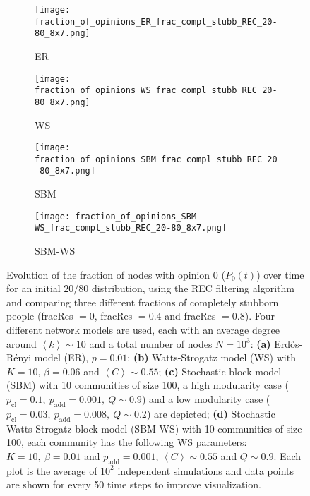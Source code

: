 \documentclass[11 pt , letterpaper , twoside , openright]{book}
\begin{document}
\begin{figure}[H]
  \begin{subfigure}[b]{0.49\textwidth}
  	\texttt{[image: fraction\_of\_opinions\_ER\_frac\_compl\_stubb\_REC\_20-80\_8x7.png]}
    \caption{ER}
  \end{subfigure}
  \begin{subfigure}[b]{0.49\textwidth}
  	\texttt{[image: fraction\_of\_opinions\_WS\_frac\_compl\_stubb\_REC\_20-80\_8x7.png]}
    \caption{WS}
  \end{subfigure}
  \begin{subfigure}[b]{0.49\textwidth}
    \texttt{[image: fraction\_of\_opinions\_SBM\_frac\_compl\_stubb\_REC\_20-80\_8x7.png]}
    \caption{SBM}
  \end{subfigure}
  \begin{subfigure}[b]{0.49\textwidth}
    \texttt{[image: fraction\_of\_opinions\_SBM-WS\_frac\_compl\_stubb\_REC\_20-80\_8x7.png]}
    \caption{SBM-WS}
  \end{subfigure}
  \captionsetup{format=plain}
  \caption[Evolution of the fraction of nodes with opinion 0 ($P_0(t)$) over time for an initial $20/80$ opinion distribution, using the REC filtering algorithm and comparing three different fractions of completely stubborn people (fracRes $= 0$, fracRes $= 0.4$ and fracRes $= 0.8$).]{Evolution of the fraction of nodes with opinion 0 ($P_0(t)$) over time for an initial $20/80$ distribution, using the REC filtering algorithm and comparing three different fractions of completely stubborn people (fracRes $= 0$, fracRes $= 0.4$ and fracRes $= 0.8$). Four different network models are used, each with an average degree around $\left<k\right> \sim 10$ and a total number of nodes $N = 10^3$: \textbf{(a)} Erd\H{o}s-R\'{e}nyi model (ER), $p=0.01$; \textbf{(b)} Watts-Strogatz model (WS) with $K = 10$, $\beta = 0.06$ and $\left<C\right> \sim 0.55$; \textbf{(c)} Stochastic block model (SBM) with 10 communities of size 100, a high modularity case ($p_{\text{cl}} = 0.1,\ p_{\text{add}} = 0.001,\ Q \sim 0.9$) and a low modularity case ($p_{\text{cl}} = 0.03,\ p_{\text{add}} = 0.008,\ Q \sim 0.2$) are depicted; \textbf{(d)} Stochastic Watts-Strogatz block model (SBM-WS) with 10 communities of size 100, each community has the following WS parameters: $K = 10,\ \beta = 0.01$ and $p_{\text{add}} = 0.001$, $\left<C\right> \sim 0.55$ and $Q \sim 0.9$. Each plot is the average of $10^2$ independent simulations and data points are shown for every 50 time steps to improve visualization.}%
\label{ev_op_20_80_stubb_REC}
\end{figure}
\end{document}
